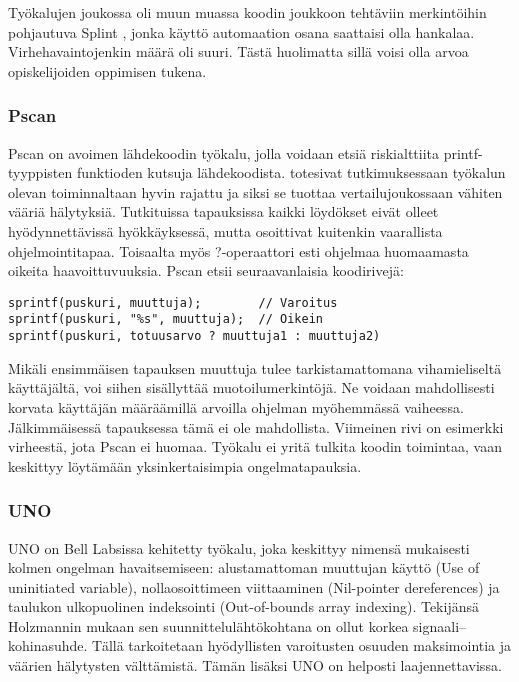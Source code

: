 Työkalujen joukossa oli muun muassa koodin joukkoon tehtäviin merkintöihin
pohjautuva Splint \citep{tevis2004methods}, jonka käyttö automaation osana
saattaisi olla hankalaa. Virhehavaintojenkin määrä oli suuri. Tästä huolimatta
sillä voisi olla arvoa opiskelijoiden oppimisen tukena.

\subsubsection{Pscan}

Pscan on avoimen lähdekoodin työkalu, jolla voidaan etsiä riskialttiita
printf-tyyppisten funktioden kutsuja lähdekoodista.
\citet{heffley2004can} totesivat tutkimuksessaan työkalun olevan
toiminnaltaan hyvin rajattu ja siksi se tuottaa vertailujoukossaan vähiten
vääriä hälytyksiä. Tutkituissa tapauksissa kaikki löydökset eivät olleet
hyödynnettävissä hyökkäyksessä, mutta osoittivat kuitenkin vaarallista
ohjelmointitapaa. Toisaalta myös ?-operaattori esti ohjelmaa huomaamasta
oikeita haavoittuvuuksia. Pscan etsii seuraavanlaisia koodirivejä:

\begin{verbatim}
sprintf(puskuri, muuttuja);        // Varoitus
sprintf(puskuri, "%s", muuttuja);  // Oikein
sprintf(puskuri, totuusarvo ? muuttuja1 : muuttuja2) 
\end{verbatim}

Mikäli ensimmäisen tapauksen muuttuja tulee tarkistamattomana vihamieliseltä
käyttäjältä, voi siihen sisällyttää muotoilumerkintöjä. Ne voidaan
mahdollisesti korvata käyttäjän määräämillä arvoilla ohjelman myöhemmässä
vaiheessa. Jälkimmäisessä tapauksessa tämä ei ole mahdollista. Viimeinen rivi on
esimerkki virheestä, jota Pscan ei huomaa. \citep{heffley2004can} Työkalu ei
yritä tulkita koodin toimintaa, vaan keskittyy löytämään yksinkertaisimpia
ongelmatapauksia.

\subsubsection{UNO}

UNO on Bell Labsissa kehitetty työkalu, joka keskittyy nimensä mukaisesti kolmen
ongelman havaitsemiseen: alustamattoman muuttujan käyttö (Use of uninitiated
variable), nollaosoittimeen viittaaminen (Nil-pointer dereferences) ja taulukon
ulkopuolinen indeksointi (Out-of-bounds array indexing). Tekijänsä Holzmannin
mukaan sen suunnittelulähtökohtana on ollut korkea signaali--kohinasuhde. Tällä
tarkoitetaan hyödyllisten varoitusten osuuden maksimointia ja väärien
hälytysten välttämistä. Tämän lisäksi UNO on helposti laajennettavissa.
\citep{tevis2004methods} \citep{uno}

